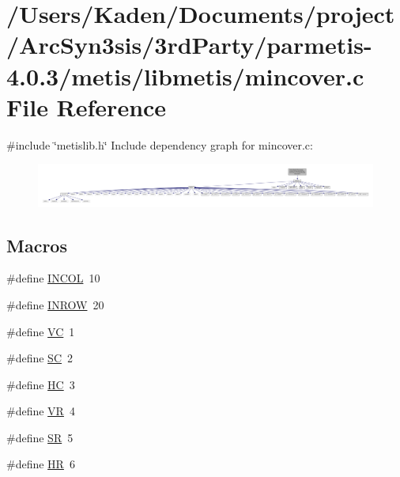 \hypertarget{a00245}{}\section{/\+Users/\+Kaden/\+Documents/project/\+Arc\+Syn3sis/3rd\+Party/parmetis-\/4.0.3/metis/libmetis/mincover.c File Reference}
\label{a00245}
{\ttfamily \#include \char`\"{}metislib.\+h\char`\"{}}\newline
Include dependency graph for mincover.\+c\+:\nopagebreak
\begin{figure}[H]
\begin{center}
\leavevmode
\includegraphics[width=350pt]{a00246}
\end{center}
\end{figure}
\subsection*{Macros}
\begin{DoxyCompactItemize}
\item 
\#define \hyperlink{a00245_ae32d01fd4cd18c869890a19c37b1258c}{I\+N\+C\+OL}~10
\item 
\#define \hyperlink{a00245_a035a2028a6ea146356743a6d3a94703c}{I\+N\+R\+OW}~20
\item 
\#define \hyperlink{a00245_aa6cbe827dd9151e470fb5111c63df685}{VC}~1
\item 
\#define \hyperlink{a00245_a6bb7a09d1931dfbdd6d373cfe6e23357}{SC}~2
\item 
\#define \hyperlink{a00245_a29939a749d943e3eba661f4f0302ef72}{HC}~3
\item 
\#define \hyperlink{a00245_ae35e5b9a801b8c91c5597bb6c62db08a}{VR}~4
\item 
\#define \hyperlink{a00245_abaed93a16a0cde13f32bc4dc48b96804}{SR}~5
\item 
\#define \hyperlink{a00245_a9f4fe887f0a8d76a310f6539ebbae763}{HR}~6
\end{DoxyCompactItemize}
